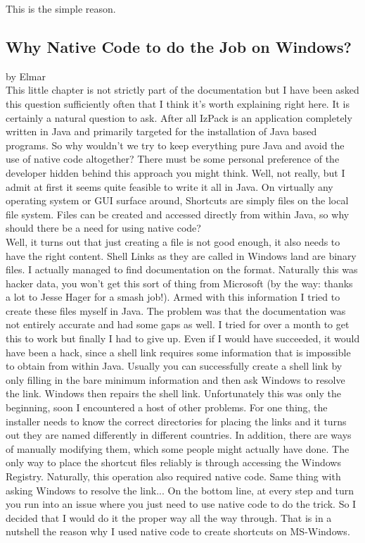 This is the simple reason.\\



\subsection{Why Native Code to do the Job on Windows?}

by Elmar\\

This little chapter is not strictly part of the documentation but I have
been asked this question sufficiently often that I think it's worth
explaining right here. It is certainly a natural question to ask. After
all IzPack is an application completely written in Java and primarily
targeted for the installation of Java based programs. So why wouldn't we
try to keep everything pure Java and avoid the use of native code
altogether? There must be some personal preference of the developer
hidden behind this approach you might think. Well, not really, but I
admit at first it seems quite feasible to write it all in Java. On
virtually any operating system or GUI surface around, Shortcuts are
simply files on the local file system. Files can be created and accessed
directly from within Java, so why should there be a need for using
native code?\\

Well, it turns out that just creating a file is not good enough, it also
needs to have the right content. Shell Links as they are called in
Windows land are binary files. I actually managed to find documentation
on the format. Naturally this was hacker data, you won't get this sort
of thing from Microsoft (by the way: thanks a lot to Jesse Hager for a
smash job!). Armed with this information I tried to create these files
myself in Java. The problem was that the documentation was not entirely
accurate and had some gaps as well. I tried for over a month to get this
to work but finally I had to give up. Even if I would have succeeded, it
would have been a hack, since a shell link requires some information that
is impossible to obtain from within Java. Usually you can successfully
create a shell link by only filling in the bare minimum information and
then ask Windows to resolve the link. Windows then repairs the shell
link. Unfortunately this was only the beginning, soon I encountered a
host of other problems. For one thing, the installer needs to know the
correct directories for placing the links and it turns out they are
named differently in different countries. In addition, there are ways of
manually modifying them, which some people might actually have done. The
only way to place the shortcut files reliably is through accessing the
Windows Registry. Naturally, this operation also required native code.
Same thing with asking Windows to resolve the link... On the bottom
line, at every step and turn you run into an issue where you just need
to use native code to do the trick. So I decided that I would do it the
proper way all the way through. That is in a nutshell the reason why I
used native code to create shortcuts on MS-Windows.\\

